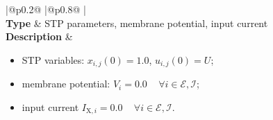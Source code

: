 \documentclass[a4paper, 12pt, twoside, openright]{book}
\newcommand{\mV}{\,\text{mV}}
\newcommand{\pA}{\,\text{pA}}
\newcommand{\Epop}{\mathcal{E}} %
\newcommand{\ext}{\text{X}}   %
\newcommand{\Ipop}{\mathcal{I}} %
\def\marg{2pt}
\begin{document}
\begin{table}[H]
\begin{tabular}{
  |@{\hspace*{\marg}}p{}@{\hspace*{\marg}}
  |@{\hspace*{\marg}}p{}@{\hspace*{\marg}}
  |}
  \hline 
  \\
\hline 
\textbf{Type} & STP parameters, membrane potential, input current\\
\hline 
  \textbf{Description} &
  \begin{itemize}
  \item STP variables: $x_{i,j}(0)=1.0$, $u_{i,j}(0)=U$;
  \item membrane potential: $V_{i}=0.0$\mV  $\quad\forall i \in \Epop, \Ipop$;
  \item input current $I_{\ext,i}=0.0$\pA $\quad\forall i \in \Epop, \Ipop$.
  \end{itemize}\\
  \hline 
\end{tabular}
\caption{Description of the network model.}
\end{table}
\end{document}
